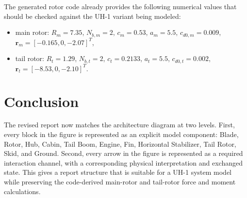 \documentclass[12pt,a4paper]{article}
\begin{document}
The generated rotor code already provides the following numerical values that should be checked against the UH-1 variant being modeled:
\begin{itemize}
  \item main rotor: $R_m = 7.35$, $N_{b,m}=2$, $c_m=0.53$, $a_m=5.5$, $c_{d0,m}=0.009$, $\mathbf{r}_m=[-0.165,0,-2.07]^T$,
  \item tail rotor: $R_t = 1.29$, $N_{b,t}=2$, $c_t=0.2133$, $a_t=5.5$, $c_{d0,t}=0.002$, $\mathbf{r}_t=[-8.53,0,-2.10]^T$.
\end{itemize}

\section{Conclusion}

The revised report now matches the architecture diagram at two levels. First, every block in the figure is represented as an explicit model component: Blade, Rotor, Hub, Cabin, Tail Boom, Engine, Fin, Horizontal Stabilizer, Tail Rotor, Skid, and Ground. Second, every arrow in the figure is represented as a required interaction channel, with a corresponding physical interpretation and exchanged state. This gives a report structure that is suitable for a UH-1 system model while preserving the code-derived main-rotor and tail-rotor force and moment calculations.
\end{document}
